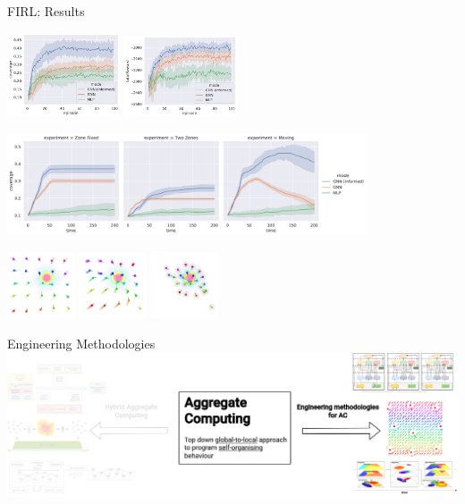 \documentclass[presentation, 8pt,169]{beamer}\mode<presentation>{\usetheme{AMSBolognaFC}}
\begin{document}
\begin{frame}[allowframebreaks]{FIRL: Results}
  
\begin{center}
  \includegraphics[width=0.25\textwidth]{img/coverage-in-time.pdf}
  \includegraphics[width=0.25\textwidth]{img/reward-in-time.pdf}
\end{center}

  \centering
\includegraphics[width=0.8\textwidth]{img/coverage-test.pdf}
\begin{center}
\includegraphics[width=0.15\textwidth]{img/start.png}
\includegraphics[width=0.15\textwidth]{img/after.png}
\includegraphics[width=0.15\textwidth]{img/end.png}
\end{center}
\end{frame}
\begin{frame}{Engineering Methodologies}
  \includegraphics[width=\textwidth]{img/eng-part.drawio.png}
\end{frame}
\end{document}
